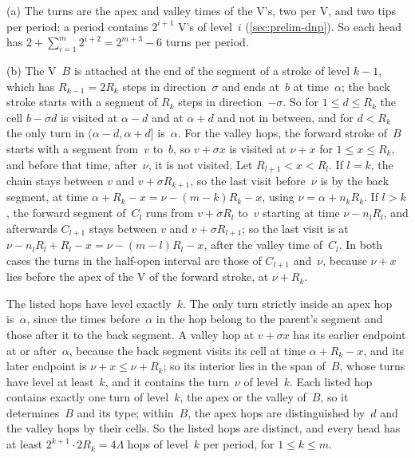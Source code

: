 \begin{informalproof}
(a) The turns are the apex and valley times of the V's, two per V, and two tips per period; a period contains $2^{i+1}$ V's
of level~$i$ (\cref{sec:prelim-dnp}). So each head has $2+\sum_{i=1}^m2^{i+2}=2^{m+3}-6$ turns per period.

(b) The V~$B$ is attached at the end of the segment of a stroke of level $k-1$, which has $R_{k-1}=2R_k$ steps in
direction~$\sigma$ and ends at~$b$ at time~$\alpha$; the back stroke starts with a segment of $R_k$ steps in
direction~$-\sigma$. So for $1\le d\le R_k$ the cell $b-\sigma d$ is visited at $\alpha-d$ and at $\alpha+d$ and not in
between, and for $d<R_k$ the only turn in $(\alpha-d,\alpha+d]$ is~$\alpha$. For the valley hops, the forward stroke of~$B$
starts with a segment from~$v$ to~$b$, so $v+\sigma x$ is visited at $\nu+x$ for $1\le x\le R_k$, and before that time,
after~$\nu$, it is not visited. Let $R_{l+1}<x<R_l$. If $l=k$, the chain stays between $v$ and $v+\sigma R_{k+1}$, so the
last visit before~$\nu$ is by the back segment, at time $\alpha+R_k-x=\nu-(m-k)R_k-x$, using $\nu=\alpha+n_kR_k$. If
$l>k$, the forward segment of~$C_l$ runs from $v+\sigma R_l$ to~$v$ starting at time $\nu-n_lR_l$, and afterwards $C_{l+1}$
stays between $v$ and $v+\sigma R_{l+1}$; so the last visit is at $\nu-n_lR_l+R_l-x=\nu-(m-l)R_l-x$, after the valley
time of~$C_l$. In both cases the turns in the half-open interval are those of $C_{l+1}$ and~$\nu$, because $\nu+x$ lies
before the apex of the V of the forward stroke, at $\nu+R_k$.

The listed hops have level exactly~$k$. The only turn strictly inside an apex hop is~$\alpha$, since the times before~$\alpha$
in the hop belong to the parent's segment and those after it to the back segment. A valley hop at $v+\sigma x$ has its
earlier endpoint at or after~$\alpha$, because the back segment visits its cell at time $\alpha+R_k-x$, and its later
endpoint is $\nu+x\le\nu+R_k$; so its interior lies in the span of~$B$, whose turns have level at least~$k$, and it contains
the turn~$\nu$ of level~$k$. Each listed hop contains exactly one turn of level~$k$, the apex or the valley of~$B$, so it
determines~$B$ and its type; within~$B$, the apex hops are distinguished by~$d$ and the valley hops by their cells. So the
listed hops are distinct, and every head has at least $2^{k+1}\cdot2R_k=4\Lambda$ hops of level~$k$ per period, for
$1\le k\le m$.


\end{informalproof}
